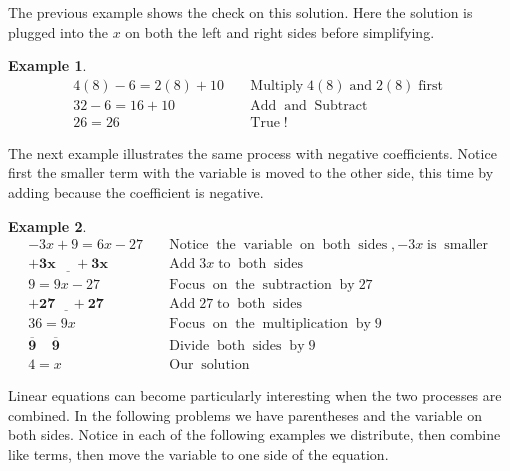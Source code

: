 \documentclass[12pt]{book}
\theoremstyle{definition}
\newtheorem{example}{Example}
\newcommand{\tmmathbf}[1]{\ensuremath{\boldsymbol{#1}}}
\newcommand{\tmop}[1]{\ensuremath{\operatorname{#1}}}
\begin{document}
The previous example shows the check on this solution. Here the solution is plugged into the $x$ on both the left and right sides before simplifying.
\begin{example}\label{Lin22}
\begin{eqnarray*}
  4 (8) - 6 = 2 (8) + 10 &  & \tmop{Multiply} 4 (8) \tmop{and} 2 (8)
  \tmop{first}\\
  32 - 6 = 16 + 10 &  & \tmop{Add} \tmop{and} \tmop{Subtract}\\
  26 = 26 &  & \tmop{True} !
\end{eqnarray*}
\end{example}
The next example illustrates the same process with negative coefficients. Notice first the smaller term with the variable is moved to the other side, this time by adding because the coefficient is negative.
\begin{example}\label{Lin23}
  \begin{eqnarray*}
    - 3 x + 9 = 6 x - 27 &  & \tmop{Notice} \tmop{the} \tmop{variable}
    \tmop{on} \tmop{both} \tmop{sides}, - 3 x \tmop{is} \tmop{smaller}\\
    \tmmathbf{\underline{+ 3 x ~~~~~~+ 3 x}}~~~~~  &  & \tmop{Add} 3 x \tmop{to}
    \tmop{both} \tmop{sides}\\
    9 = 9 x - 27 &  & \tmop{Focus} \tmop{on} \tmop{the} \tmop{subtraction}
    \tmop{by} 27\\
    \tmmathbf{\underline{+ 27 ~~~~~+ 27}} &  & \tmop{Add} 27 \tmop{to} \tmop{both}
    \tmop{sides}\\
    36 = 9 x &  & \tmop{Focus} \tmop{on} \tmop{the} \tmop{multiplication}
    \tmop{by} 9\\
    \tmmathbf{\overline{9} ~~~~~ \overline{9} }~  &  & \tmop{Divide} \tmop{both}
    \tmop{sides} \tmop{by} 9\\
    4 = x &  & \tmop{Our} \tmop{solution}
  \end{eqnarray*}
\end{example}
Linear equations can become particularly interesting when the two processes are combined. In the following problems we have parentheses and the variable on both sides. Notice in each of the following examples we distribute, then combine like terms, then move the variable to one side of the equation.
\end{document}
